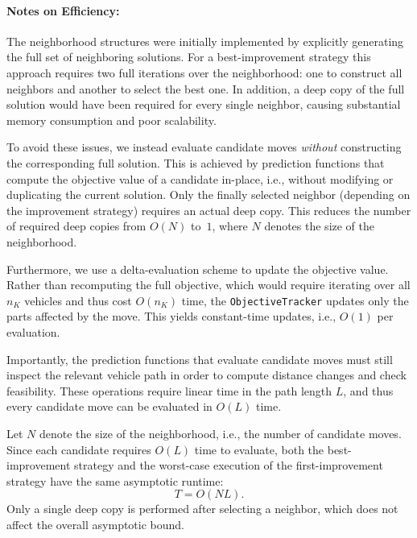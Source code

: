 \documentclass[12pt]{article}
\begin{document}
\paragraph{Notes on Efficiency:}

The neighborhood structures were initially implemented by explicitly generating the full set of neighboring solutions. For a best-improvement strategy this approach requires two full iterations over the neighborhood: one to construct all neighbors and another to select the best one. In addition, a deep copy of the full solution would have been required for every single neighbor, causing substantial memory consumption and poor scalability.

\bigskip

To avoid these issues, we instead evaluate candidate moves \emph{without} constructing the corresponding full solution. This is achieved by prediction functions that compute the objective value of a candidate in-place, i.e., without modifying or duplicating the current solution. Only the finally selected neighbor (depending on the improvement strategy) requires an actual deep copy. This reduces the number of required deep copies from $O(N)$ to~$1$, where $N$ denotes the size of the neighborhood.

\bigskip

Furthermore, we use a delta-evaluation scheme to update the objective value. Rather than recomputing the full objective, which would require iterating over all $n_K$ vehicles and thus cost $O(n_K)$ time, the \texttt{ObjectiveTracker} updates only the parts affected by the move. This yields constant-time updates, i.e., $O(1)$ per evaluation.

\bigskip

Importantly, the prediction functions that evaluate candidate moves must still inspect the relevant vehicle path in order to compute distance changes and check feasibility. These operations require linear time in the path length $L$, and thus every candidate move can be evaluated in $O(L)$ time.

\bigskip

Let $N$ denote the size of the neighborhood, i.e., the number of candidate moves. Since each candidate requires $O(L)$ time to evaluate, both the best-improvement strategy and the worst-case execution of the first-improvement strategy have the same asymptotic runtime:
\[
T = O(NL).
\]
Only a single deep copy is performed after selecting a neighbor, which does not affect the overall asymptotic bound.
\end{document}
